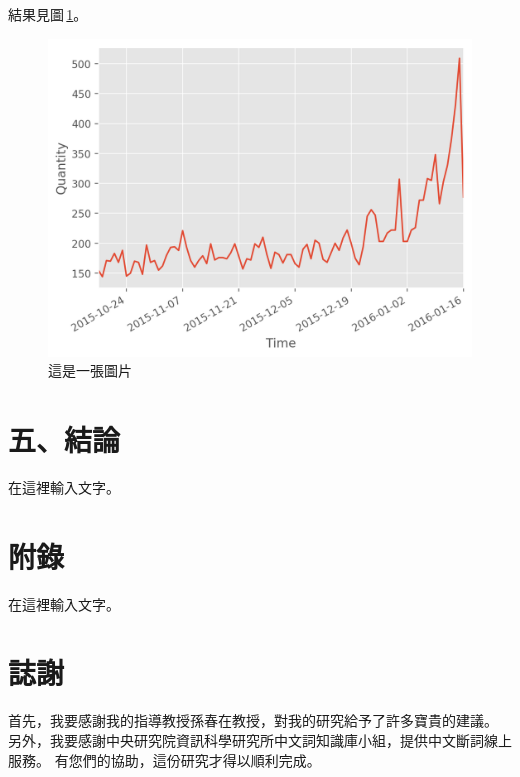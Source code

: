 \documentclass[letterpaper, 10pt, conference]{ieeeconf}   %
\begin{document}
\begin{CJK*}{UTF8}{bsmi}
結果見圖\,\ref{f1}。

\begin{figure}[!htbp]
\centering
\includegraphics[width=\columnwidth]{quantity_time_graph}
\caption{這是一張圖片}
\label{f1}
\end{figure}

\section*{五、結論}

在這裡輸入文字。

\addtolength{\textheight}{-12cm}  %


\section*{附錄}

在這裡輸入文字。

\section*{誌謝}

首先，我要感謝我的指導教授孫春在教授，對我的研究給予了許多寶貴的建議。
另外，我要感謝中央研究院資訊科學研究所中文詞知識庫小組，提供中文斷詞線上服務。
有您們的協助，這份研究才得以順利完成。





\end{CJK*}
\end{document}
